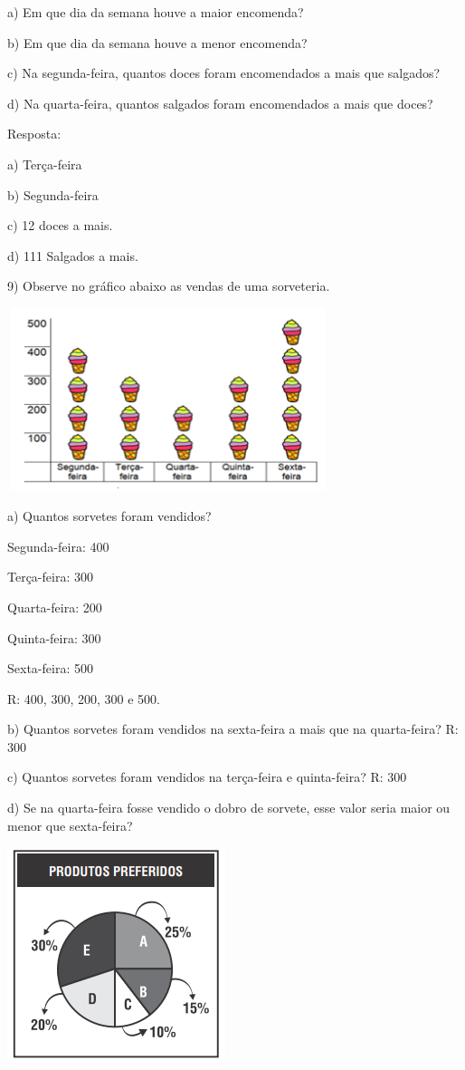 a) Em que dia da semana houve a maior encomenda?

b) Em que dia da semana houve a menor encomenda?

c) Na segunda-feira, quantos doces foram encomendados a mais que
salgados?

d) Na quarta-feira, quantos salgados foram encomendados a mais que
doces?

Resposta:

a) Terça-feira

b) Segunda-feira

c) 12 doces a mais.

d) 111 Salgados a mais.

9) Observe no gráfico abaixo as vendas de uma sorveteria.

\includegraphics[width=3.7in,height=2.1in]{./imgSAEB_6_MAT/media/image87.png}

a) Quantos sorvetes foram vendidos?

Segunda-feira: 400

Terça-feira: 300

Quarta-feira: 200

Quinta-feira: 300

Sexta-feira: 500

R: 400, 300, 200, 300 e 500.

b) Quantos sorvetes foram vendidos na sexta-feira a mais que na
quarta-feira? R: 300

c) Quantos sorvetes foram vendidos na terça-feira e quinta-feira? R: 300

d) Se na quarta-feira fosse vendido o dobro de sorvete, esse valor seria
maior ou menor que sexta-feira?

\includegraphics[width=2.51181in,height=2.47708in]{./imgSAEB_6_MAT/media/image88.png}

